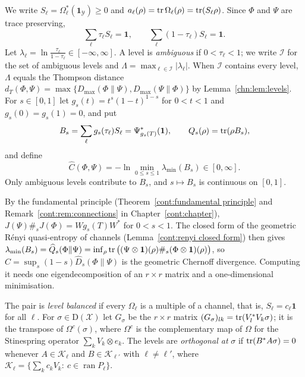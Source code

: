 We write $S_\ell=\Omega_\ell^*(\mathbf 1_{\mathcal Y})\ge0$ and $a_\ell(\rho)=\operatorname{tr}\Omega_\ell(\rho)=\operatorname{tr}(S_\ell\rho)$. Since $\Phi$ and $\Psi$ are trace preserving,
\begin{equation}\label{chn:eq:normal}
\sum_\ell\tau_\ell S_\ell=\mathbf 1,\qquad\sum_\ell(1-\tau_\ell)S_\ell=\mathbf 1 .
\end{equation}
Let $\lambda_\ell=\ln\frac{\tau_\ell}{1-\tau_\ell}\in[-\infty,\infty]$. A level is \emph{ambiguous} if $0<\tau_\ell<1$; we write $\mathcal I$ for the set of ambiguous levels and $\Lambda=\max_{\ell\in\mathcal I}|\lambda_\ell|$. When $\mathcal I$ contains every level, $\Lambda$ equals the Thompson distance $d_T(\Phi,\Psi)=\max\{D_{\max}(\Phi\|\Psi),D_{\max}(\Psi\|\Phi)\}$ by Lemma~\ref{chn:lem:levels}. For $s\in[0,1]$ let $g_s(t)=t^s(1-t)^{1-s}$ for $0<t<1$ and $g_s(0)=g_s(1)=0$, and put
\[
B_s=\sum_{\ell}g_s(\tau_\ell)S_\ell=\Psi_{g_s(T)}^*(\mathbf 1),\qquad Q_s(\rho)=\operatorname{tr}(\rho B_s),
\]
and define
\[
\widehat C(\Phi,\Psi)=-\ln\min_{0\le s\le1}\lambda_{\min}(B_s)\in[0,\infty].
\]
Only ambiguous levels contribute to $B_s$, and $s\mapsto B_s$ is continuous on $[0,1]$.

\begin{remark}\label{chn:rem:geom}
By the fundamental principle (Theorem~\ref{cont:fundamental principle} and Remark~\ref{cont:rem:connections} in Chapter~\ref{cont:chapter}), $J(\Psi)\#_sJ(\Phi)=Wg_s(T)W^*$ for $0<s<1$. The closed form of the geometric R\'enyi quasi-entropy of channels \cite{KatariyaWilde2021} (Lemma~\ref{cont:renyi closed form}) then gives $\lambda_{\min}(B_s)=\widehat Q_s(\Phi\|\Psi)=\inf_\rho\operatorname{tr}\big((\Psi\otimes\mathbf 1)(\rho)\#_s(\Phi\otimes\mathbf 1)(\rho)\big)$, so $\widehat C=\sup_s(1-s)\widehat D_s(\Phi\|\Psi)$ is the geometric Chernoff divergence. Computing it needs one eigendecomposition of an $r\times r$ matrix and a one-dimensional minimisation.
\end{remark}

\begin{definition}\label{chn:def:balanced}
The pair is \emph{level balanced} if every $\Omega_\ell$ is a multiple of a channel, that is, $S_\ell=c_\ell\mathbf 1$ for all $\ell$. For $\sigma\in\mathrm D(\mathcal X)$ let $G_\sigma$ be the $r\times r$ matrix $(G_\sigma)_{lk}=\operatorname{tr}(V_l^*V_k\sigma)$; it is the transpose of $\Omega^c(\sigma)$, where $\Omega^c$ is the complementary map of $\Omega$ for the Stinespring operator $\sum_kV_k\otimes e_k$. The levels are \emph{orthogonal at} $\sigma$ if $\operatorname{tr}(B^*A\sigma)=0$ whenever $A\in\mathcal K_\ell$ and $B\in\mathcal K_{\ell'}$ with $\ell\neq\ell'$, where $\mathcal K_\ell=\{\sum_kc_kV_k:\ c\in\operatorname{ran}P_\ell\}$.
\end{definition}

